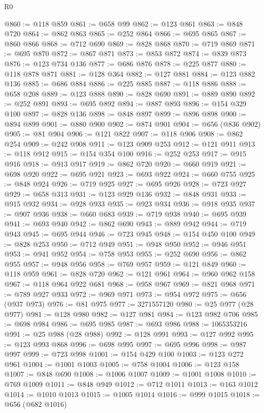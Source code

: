 \begin{lexlean}{R0}
\begin{coremodule}
@860 := @118 @859
@861 := @658 @99
@862 := @123 @861
@863 := @848 @720
@864 := @862 @863
@865 := @252 @864
@866 := @695 @865
@867 := @860 @866
@868 := @712 @690
@869 := @828 @868
@870 := @719 @869
@871 := @695 @870
@872 := @867 @871
@873 := @853 @872
@874 := @839 @873
@876 := @123 @734 @136
@877 := @686 @876
@878 := @225 @877
@880 := @118 @878 @871
@881 := @128 @364
@882 := @127 @881
@884 := @123 @882 @136
@885 := @686 @884
@886 := @225 @885
@887 := @118 @886
@888 := @658 @208
@889 := @123 @888
@890 := @828 @690
@891 := @889 @890
@892 := @252 @891
@893 := @695 @892
@894 := @887 @893
@896 := @154 @329 @100
@897 := @828 @136
@898 := @848 @897
@899 := @896 @898
@900 := @894 @899
@901 := @880 @900
@902 := @874 @901
@904 := @656 (@836 @902)
@905 := @81 @904
@906 := @121 @822
@907 := @118 @906
@908 := @862 @254
@909 := @242 @908
@911 := @123 @909 @253
@912 := @121 @911
@913 := @118 @912
@915 := @154 @354 @100
@916 := @252 @253
@917 := @915 @916
@918 := @913 @917
@919 := @862 @720
@920 := @660 @919
@921 := @698 @920
@922 := @695 @921
@923 := @693 @922
@924 := @660 @755
@925 := @848 @924
@926 := @719 @925
@927 := @695 @926
@928 := @723 @927
@929 := @658 @313
@931 := @123 @929 @136
@932 := @848 @931
@933 := @915 @932
@934 := @928 @933
@935 := @923 @934
@936 := @918 @935
@937 := @907 @936
@938 := @660 @683
@939 := @719 @938
@940 := @695 @939
@941 := @693 @940
@942 := @862 @690
@943 := @889 @942
@944 := @719 @943
@945 := @695 @944
@946 := @723 @945
@948 := @154 @450 @100
@949 := @828 @253
@950 := @712 @949
@951 := @948 @950
@952 := @946 @951
@953 := @941 @952
@954 := @758 @953
@955 := @252 @690
@956 := @862 @955
@957 := @948 @956
@958 := @769 @957
@959 := @121 @849
@960 := @118 @959
@961 := @828 @720
@962 := @121 @961
@964 := @960 @962 @158
@967 := @118 @964 @922 @681
@968 := @958 @967
@969 := @821 @968
@971 := @789 @927 @933
@972 := @969 @971
@973 := @954 @972
@975 := @656 (@937 @973)
@976 := @81 @975
@977 := 3271557120
@980 := @25 @977 (@28 @977)
@981 := @128 @980
@982 := @127 @981
@984 := @123 @982 @706
@985 := @698 @984
@986 := @695 @985
@987 := @693 @986
@988 := 1065353216
@991 := @25 @988 (@28 @988)
@992 := @128 @991
@993 := @127 @992
@995 := @123 @993 @868
@996 := @698 @995
@997 := @695 @996
@998 := @987 @997
@999 := @723 @998
@1001 := @154 @429 @100
@1003 := @123 @272 @961
@1004 := @1001 @1003
@1005 := @758 @1004
@1006 := @123 @158
@1007 := @848 @690
@1008 := @1006 @1007
@1009 := @1001 @1008
@1010 := @769 @1009
@1011 := @848 @949
@1012 := @712 @1011
@1013 := @163 @1012
@1014 := @1010 @1013
@1015 := @1005 @1014
@1016 := @999 @1015
@1018 := @656 (@682 @1016)

\end{coremodule}
\end{lexlean}
